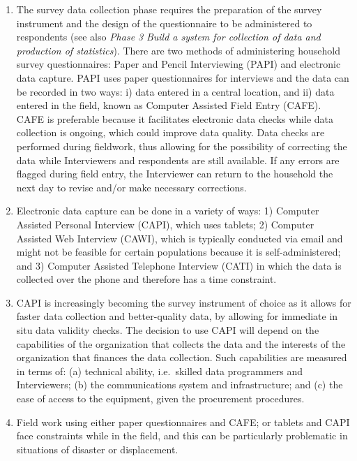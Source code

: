 \documentclass[
]{article}
\begin{document}
\begin{enumerate}
\def\labelenumi{\arabic{enumi}.}
\setcounter{enumi}{327}
\item
  The survey data collection phase requires the preparation of the
  survey instrument and the design of the questionnaire to be
  administered to respondents (see also \emph{Phase 3} \emph{Build a system for
  collection of data and production of statistics}). There are two
  methods of administering household survey questionnaires: Paper and
  Pencil Interviewing (PAPI) and electronic data capture. PAPI uses
  paper questionnaires for interviews and the data can be recorded in
  two ways: i) data entered in a central location, and ii) data
  entered in the field, known as Computer Assisted Field Entry (CAFE).
  CAFE is preferable because it facilitates electronic data checks
  while data collection is ongoing, which could improve data quality.
  Data checks are performed during fieldwork, thus allowing for the
  possibility of correcting the data while Interviewers and
  respondents are still available. If any errors are flagged during
  field entry, the Interviewer can return to the household the next
  day to revise and/or make necessary corrections.
\item
  Electronic data capture can be done in a variety of ways: 1)
  Computer Assisted Personal Interview (CAPI), which uses tablets; 2)
  Computer Assisted Web Interview (CAWI), which is typically conducted
  via email and might not be feasible for certain populations because
  it is self-administered; and 3) Computer Assisted Telephone
  Interview (CATI) in which the data is collected over the phone and
  therefore has a time constraint.
\item
  CAPI is increasingly becoming the survey instrument of choice as it
  allows for faster data collection and better-quality data, by
  allowing for immediate in situ data validity checks. The decision to
  use CAPI will depend on the capabilities of the organization that
  collects the data and the interests of the organization that
  finances the data collection. Such capabilities are measured in
  terms of: (a) technical ability, i.e.~skilled data programmers and
  Interviewers; (b) the communications system and infrastructure;
  and (c) the ease of access to the equipment, given the procurement
  procedures.
\item
  Field work using either paper questionnaires and CAFE; or tablets
  and CAPI face constraints while in the field, and this can be
  particularly problematic in situations of disaster or displacement.
\end{enumerate}
\end{document}
